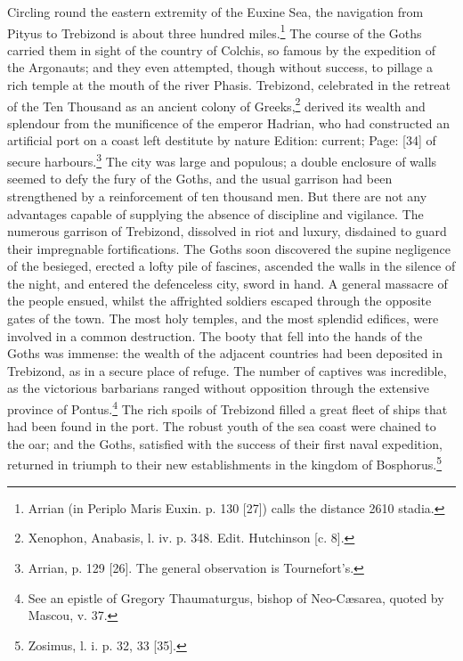 Circling round the eastern extremity of the Euxine Sea, the navigation from Pityus to Trebizond is about three hundred miles.\footnote{Arrian (in Periplo Maris Euxin. p. 130 [27]) calls the distance 2610 stadia.} The course of the Goths carried them in sight of the country of Colchis, so famous by the expedition of the Argonauts; and they even attempted, though without success, to pillage a rich temple at the mouth of the river Phasis. Trebizond, celebrated in the retreat of the Ten Thousand as an ancient colony of Greeks,\footnote{Xenophon, Anabasis, l. iv. p. 348. Edit. Hutchinson [c. 8].} derived its wealth and splendour from the munificence of the emperor Hadrian, who had constructed an artificial port on a coast left destitute by nature Edition: current; Page: [34] of secure harbours.\footnote{Arrian, p. 129 [26]. The general observation is Tournefort\texthebrew{}’s.} The city was large and populous; a double enclosure of walls seemed to defy the fury of the Goths, and the usual garrison had been strengthened by a reinforcement of ten thousand men. But there are not any advantages capable of supplying the absence of discipline and vigilance. The numerous garrison of Trebizond, dissolved in riot and luxury, disdained to guard their impregnable fortifications. The Goths soon discovered the supine negligence of the besieged, erected a lofty pile of fascines, ascended the walls in the silence of the night, and entered the defenceless city, sword in hand. A general massacre of the people ensued, whilst the affrighted soldiers escaped through the opposite gates of the town. The most holy temples, and the most splendid edifices, were involved in a common destruction. The booty that fell into the hands of the Goths was immense: the wealth of the adjacent countries had been deposited in Trebizond, as in a secure place of refuge. The number of captives was incredible, as the victorious barbarians ranged without opposition through the extensive province of Pontus.\footnote{See an epistle of Gregory Thaumaturgus, bishop of Neo-Cæsarea, quoted by Mascou, v. 37.} The rich spoils of Trebizond filled a great fleet of ships that had been found in the port. The robust youth of the sea coast were chained to the oar; and the Goths, satisfied with the success of their first naval expedition, returned in triumph to their new establishments in the kingdom of Bosphorus.\footnote{Zosimus, l. i. p. 32, 33 [35].}

